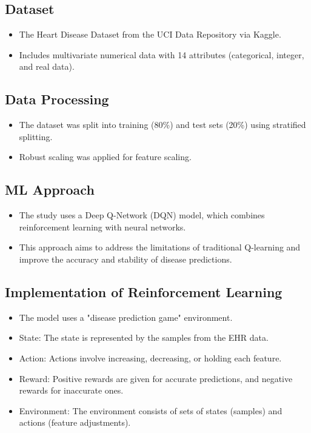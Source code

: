 \subsection*{Dataset}
\begin{itemize}
    \item The Heart Disease Dataset from the UCI Data Repository via Kaggle.
    \item Includes multivariate numerical data with 14 attributes (categorical, integer, and real data).
\end{itemize}

\subsection*{Data Processing}
\begin{itemize}
    \item The dataset was split into training (80\%) and test sets (20\%) using stratified splitting.
    \item Robust scaling was applied for feature scaling.
\end{itemize}

\subsection*{ML Approach}
\begin{itemize}
    \item The study uses a Deep Q-Network (DQN) model, which combines reinforcement learning with neural networks.
    \item This approach aims to address the limitations of traditional Q-learning and improve the accuracy and stability of disease predictions.
\end{itemize}

\subsection*{Implementation of Reinforcement Learning}
\begin{itemize}
    \item The model uses a "disease prediction game" environment.
    \item State: The state is represented by the samples from the EHR data.
    \item Action: Actions involve increasing, decreasing, or holding each feature.
    \item Reward: Positive rewards are given for accurate predictions, and negative rewards for inaccurate ones.
    \item Environment: The environment consists of sets of states (samples) and actions (feature adjustments).
\end{itemize}

